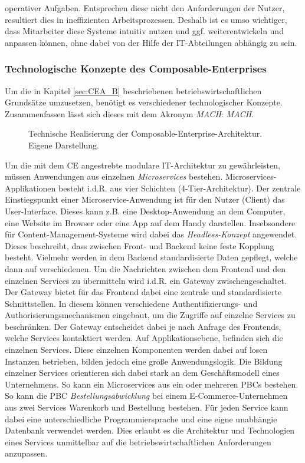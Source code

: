 operativer Aufgaben. Entsprechen diese nicht den Anforderungen der Nutzer, resultiert dies in ineffizienten Arbeitsprozessen. Deshalb ist es umso wichtiger, dass Mitarbeiter diese Systeme intuitiv nutzen und ggf. weiterentwickeln und anpassen können, ohne dabei von der Hilfe der IT-Abteilungen abhängig zu sein. 

\subsubsection{Technologische Konzepte des Composable-Enterprises}
Um die in Kapitel \ref{sec:CEA_B} beschriebenen betriebswirtschaftlichen Grundsätze umzusetzen, benötigt es verschiedener technologischer Konzepte. Zusammenfassen lässt sich dieses mit dem Akronym \textit{MACH}: \textit{\acl{MACH}}.
\begin{center}
	\begin{figure}[H]
		\centering
		\caption[Technische Realisierung der Composable-Enterprise-Architektur]{Technische Realisierung der Composable-Enterprise-Architektur. Eigene Darstellung.}
		\label{fig:CEA_K}
	\end{figure}	
\end{center}
\vspace*{-15mm}
Um die mit dem \acs{CE} angestrebte modulare IT-Architektur zu gewährleisten, müssen Anwendungen aus einzelnen \textit{Microservices} bestehen. Microservices-Applikationen besteht i.d.R. aus vier Schichten (4-Tier-Architektur). Der zentrale Einstiegspunkt einer Microservice-Anwendung ist für den Nutzer (Client) das User-Interface.  Dieses kann z.B. eine Desktop-Anwendung an dem Computer, eine Website im Browser oder eine App auf dem Handy darstellen. Insebsondere für Content-Management-Systeme wird dabei das \textit{Headless-Konzept} angewendet. Dieses beschreibt, dass zwischen Front- und Backend keine feste Kopplung besteht. Vielmehr werden in dem Backend standardisierte Daten gepflegt, welche dann auf verschiedenen. Um die Nachrichten zwischen dem Frontend und den einzelnen Services zu übermitteln wird i.d.R. ein Gateway zwischengeschaltet. Der Gateway bietet für das Frontend dabei eine zentrale und standardisierte Schnittstellen. In diesem können verschiedene Authentifizierungs- und Authorisierungsmechanismen eingebaut, um die Zugriffe auf einzelne Services zu beschränken. Der Gateway entscheidet dabei je nach Anfrage des Frontends, welche Services kontaktiert werden. Auf Applikationsebene, befinden sich die einzelnen Services. Diese einzelnen Komponenten werden dabei auf losen Instanzen betrieben, bilden jedoch eine große Anwendungslogik. Die Bildung einzelner Services orientieren sich dabei stark an dem Geschäftsmodell eines Unternehmens. So kann ein Microservices aus ein oder mehreren PBCs bestehen. So kann die PBC \textit{Bestellungsabwicklung} bei einem E-Commerce-Unternehmen aus zwei Services Warenkorb und Bestellung bestehen. Für jeden Service kann dabei eine unterschiedliche Programmiersprache und eine eigne unabhängie Datenbank verwendet werden. Dies erlaubt es die Architektur und Technologien eines Services unmittelbar auf die betriebswirtschaftlichen Anforderungen anzupassen. 
